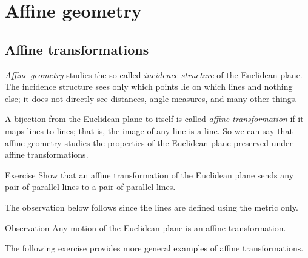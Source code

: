 
\chapter{Affine geometry}\label{chap:trans}

\section*{Affine transformations}

\emph{Affine geometry} studies the so-called \emph{incidence structure} of the Euclidean plane.
The incidence structure sees only which points lie on which lines and nothing else;
it does not directly see distances, angle measures, and many other things.

A bijection from the Euclidean plane to itself is called \emph{affine transformation} if it maps lines to lines;
that is, the image of any line is a line.
So we can say that affine geometry studies
the properties of the Euclidean plane preserved under affine transformations.

\begin{thm}{Exercise}\label{ex:affine-par}
Show that an affine transformation of the Euclidean plane sends any pair of parallel lines to a pair of parallel lines.
\end{thm}

The observation below follows since the lines are defined using the metric only.

\begin{thm}{Observation}
Any motion of the Euclidean plane is an affine transformation.
\end{thm}

The following exercise provides more general examples of affine transformations.

